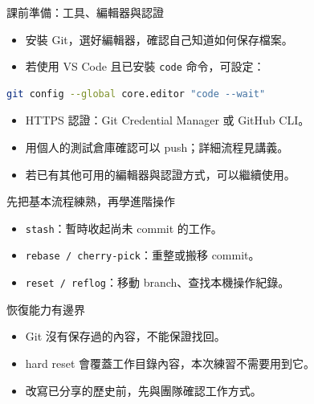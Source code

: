 \documentclass[xetex, unicode, 10pt, aspectratio=169]{beamer}
\begin{document}
\begin{frame}[fragile]{課前準備：工具、編輯器與認證}
    \begin{itemize}
        \item 安裝 Git，選好編輯器，確認自己知道如何保存檔案。
        \item 若使用 VS Code 且已安裝 \texttt{code} 命令，可設定：
    \end{itemize}
\begin{lstlisting}[language=bash]
git config --global core.editor "code --wait"
\end{lstlisting}
    \begin{itemize}
        \item HTTPS 認證：Git Credential Manager 或 GitHub CLI。
        \item 用個人的測試倉庫確認可以 push；詳細流程見講義。
        \item 若已有其他可用的編輯器與認證方式，可以繼續使用。
    \end{itemize}
    \begin{center}\end{center}
\end{frame}

\begin{frame}{先把基本流程練熟，再學進階操作}
    \begin{itemize}
        \item \texttt{stash}：暫時收起尚未 commit 的工作。
        \item \texttt{rebase / cherry-pick}：重整或搬移 commit。
        \item \texttt{reset / reflog}：移動 branch、查找本機操作紀錄。
    \end{itemize}
    \begin{block}{恢復能力有邊界}
        \begin{itemize}
            \item Git 沒有保存過的內容，不能保證找回。
            \item hard reset 會覆蓋工作目錄內容，本次練習不需要用到它。
            \item 改寫已分享的歷史前，先與團隊確認工作方式。
        \end{itemize}
    \end{block}
\end{frame}
\end{document}
